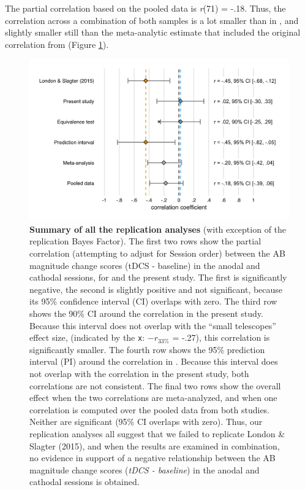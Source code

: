 \documentclass[11pt,english,]{memoir}
\begin{document}
The partial correlation based on the pooled data is \emph{r}(71) = -.18. Thus, the correlation across a combination of both samples is a lot smaller than in \textcite{London2015}, and slightly smaller still than the meta-analytic estimate that included the original correlation from \textcite{London2015} (Figure \ref{fig:fig-rep-estimate}).

\begin{figure}
\includegraphics[width=130mm]{AB_tDCS_files/figures/figure_6_estimates} \caption{\textbf{Summary of all the replication analyses} (with exception of the replication Bayes Factor). The first two rows show the partial correlation (attempting to adjust for Session order) between the AB magnitude change scores (tDCS - baseline) in the anodal and cathodal sessions, for \textcite{London2015} and the present study. The first is significantly negative, the second is slightly positive and not significant, because its 95\% confidence interval (CI) overlaps with zero. The third row shows the 90\% CI around the correlation in the present study. Because this interval does not overlap with the ``small telescopes'' effect size, (indicated by the \texttt{x}: \(-r_{33\%}\) = -.27), this correlation is significantly smaller. The fourth row shows the 95\% prediction interval (PI) around the correlation in \textcite{London2015}. Because this interval does not overlap with the correlation in the present study, both correlations are not consistent. The final two rows show the overall effect when the two correlations are meta-analyzed, and when one correlation is computed over the pooled data from both studies. Neither are significant (95\% CI overlaps with zero). Thus, our replication analyses all suggest that we failed to replicate London \& Slagter (2015), and when the results are examined in combination, no evidence in support of a negative relationship between the AB magnitude change scores (\emph{tDCS - baseline}) in the anodal and cathodal sessions is obtained.}\label{fig:fig-rep-estimate}
\end{figure}
\end{document}
